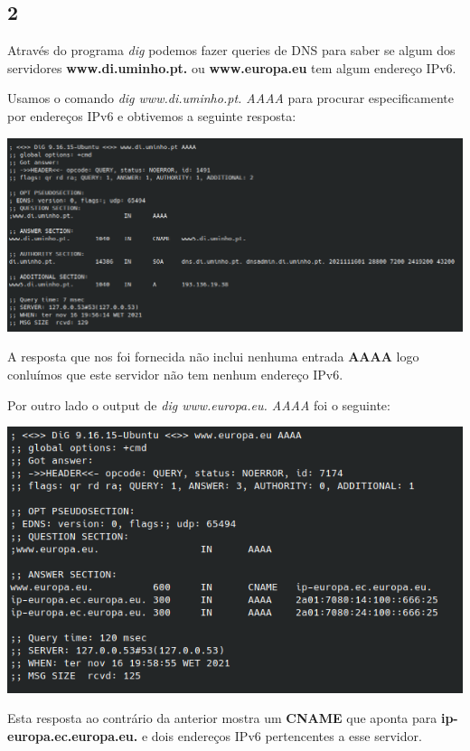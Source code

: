 \documentclass[size=11pt]{report}
\begin{document}
        \subsection*{2}
                Através do programa \textit{dig} podemos fazer queries de DNS para saber se algum dos servidores \textbf{www.di.uminho.pt.} ou \textbf{www.europa.eu}
            tem algum endereço IPv6.\par
                Usamos o comando \textit{dig www.di.uminho.pt. AAAA} para procurar especificamente por endereços IPv6 e obtivemos a seguinte resposta:    
            \par
            \noindent
            \includegraphics[width=\textwidth]{images/dig_di.png}
            \par
                A resposta que nos foi fornecida não inclui nenhuma entrada \textbf{AAAA} logo conluímos que este servidor não tem nenhum endereço IPv6.

                \vspace{0.45em}
                Por outro lado o output de \textit{dig www.europa.eu. AAAA} foi o seguinte:
            \par
            \noindent
            \includegraphics[width=\textwidth]{images/dig_europa.png}
            \par
                Esta resposta ao contrário da anterior mostra um \textbf{CNAME} que aponta para \textbf{ip-europa.ec.europa.eu.} e dois endereços IPv6 pertencentes a esse servidor.
\end{document}
